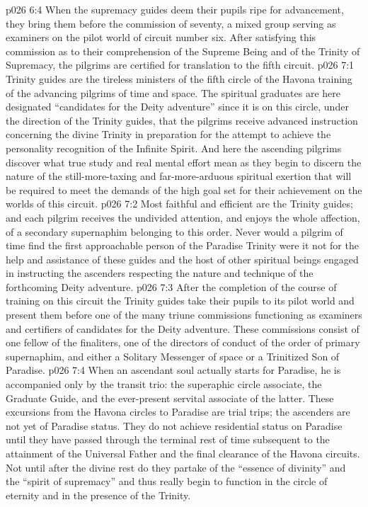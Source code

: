 \vs p026 6:4 When the supremacy guides deem their pupils ripe for advancement, they bring them before the commission of seventy, a mixed group serving as examiners on the pilot world of circuit number six. After satisfying this commission as to their comprehension of the Supreme Being and of the Trinity of Supremacy, the pilgrims are certified for translation to the fifth circuit.
\vs p026 7:1 Trinity guides are the tireless ministers of the fifth circle of the Havona training of the advancing pilgrims of time and space. The spiritual graduates are here designated “candidates for the Deity adventure” since it is on this circle, under the direction of the Trinity guides, that the pilgrims receive advanced instruction concerning the divine Trinity in preparation for the attempt to achieve the personality recognition of the Infinite Spirit. And here the ascending pilgrims discover what true study and real mental effort mean as they begin to discern the nature of the still\hyp{}more\hyp{}taxing and far\hyp{}more\hyp{}arduous spiritual exertion that will be required to meet the demands of the high goal set for their achievement on the worlds of this circuit.\plusone
\vs p026 7:2 Most faithful and efficient are the Trinity guides; and each pilgrim receives the undivided attention, and enjoys the whole affection, of a secondary supernaphim belonging to this order. Never would a pilgrim of time find the first approachable person of the Paradise Trinity were it not for the help and assistance of these guides and the host of other spiritual beings engaged in instructing the ascenders respecting the nature and technique of the forthcoming Deity adventure.
\vs p026 7:3 After the completion of the course of training on this circuit the Trinity guides take their pupils to its pilot world and present them before one of the many triune commissions functioning as examiners and certifiers of candidates for the Deity adventure. These commissions consist of one fellow of the finaliters, one of the directors of conduct of the order of primary supernaphim, and either a Solitary Messenger of space or a Trinitized Son of Paradise.
\vs p026 7:4 When an ascendant soul actually starts for Paradise, he is accompanied only by the transit trio: the superaphic circle associate, the Graduate Guide, and the ever\hyp{}present servital associate of the latter. These excursions from the Havona circles to Paradise are trial trips; the ascenders are not yet of Paradise status. They do not achieve residential status on Paradise until they have passed through the terminal rest of time subsequent to the attainment of the Universal Father and the final clearance of the Havona circuits. Not until after the divine rest do they partake of the “essence of divinity” and the “spirit of supremacy” and thus really begin to function in the circle of eternity and in the presence of the Trinity.
